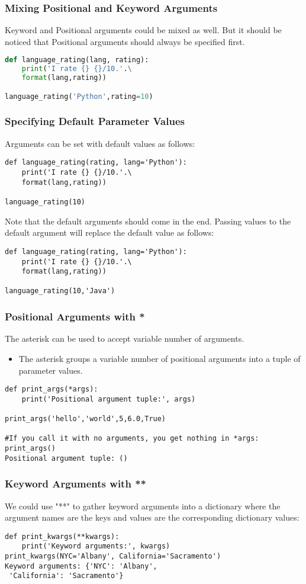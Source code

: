 \documentclass{beamer}
\begin{document}
\begin{frame}[fragile]
\frametitle{Mixing Positional and Keyword Arguments}
Keyword and Positional arguments could be mixed as well. But it should be noticed that Positional arguments should always be specified first.
\begin{lstlisting}[language=Python]
def language_rating(lang, rating):
	print('I rate {} {}/10.'.\
	format(lang,rating))

language_rating('Python',rating=10)
\end{lstlisting}
\end{frame}

\begin{frame}[fragile]
\frametitle{Specifying Default Parameter Values}
Arguments can be set with default values as follows:

\begin{lstlisting}
def language_rating(rating, lang='Python'):
	print('I rate {} {}/10.'.\
	format(lang,rating))

language_rating(10)
\end{lstlisting}
Note that the default arguments should come in the end.
Passing values to the default argument will replace the default value as follows:
\begin{lstlisting}
def language_rating(rating, lang='Python'):
	print('I rate {} {}/10.'.\
	format(lang,rating))

language_rating(10,'Java')
\end{lstlisting}
\end{frame}


\begin{frame}[fragile]
\frametitle{Positional Arguments with *}
The asterisk can be used to accept variable number of arguments.
\begin{itemize}
\item The asterisk groups a variable number of positional arguments into a tuple of parameter values.
\end{itemize}
\begin{lstlisting}
def print_args(*args):
    print('Positional argument tuple:', args)

print_args('hello','world',5,6.0,True)

#If you call it with no arguments, you get nothing in *args:
print_args()
Positional argument tuple: ()
\end{lstlisting}
\end{frame}

\begin{frame}[fragile]
\frametitle{Keyword Arguments with **}
We could use "**" to gather keyword arguments into a dictionary where the argument names are the keys and values are the corresponding dictionary values:

\begin{lstlisting}
def print_kwargs(**kwargs):
    print('Keyword arguments:', kwargs)
print_kwargs(NYC='Albany', California='Sacramento')
Keyword arguments: {'NYC': 'Albany',
 'California': 'Sacramento'}
\end{lstlisting}
\end{frame}
\end{document}
